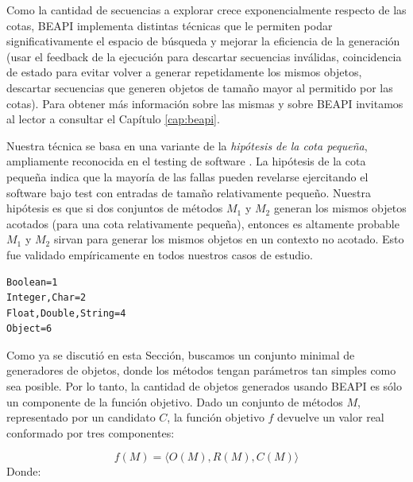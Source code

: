 Como la cantidad de secuencias a explorar crece exponencialmente respecto de las cotas, BEAPI implementa distintas técnicas que le permiten podar significativamente el espacio de búsqueda y mejorar la eficiencia de la generación (usar el feedback de la ejecución para descartar secuencias inválidas, coincidencia de estado para evitar volver a generar repetidamente los mismos objetos, descartar secuencias que generen objetos de tamaño mayor al permitido por las cotas). Para obtener más información sobre las mismas y sobre BEAPI invitamos al lector a consultar el Capítulo \ref{cap:beapi}.

Nuestra técnica se basa en una variante de la \emph{hipótesis de la cota pequeña}, ampliamente reconocida en el testing de software \cite{Andoni:2003,jackson2006, Abad13}. La hipótesis de la cota pequeña indica que la mayoría de las fallas pueden revelarse ejercitando el software bajo test con entradas de tamaño relativamente pequeño. Nuestra hipótesis es que si dos conjuntos de métodos $M_1$ y $M_2$ generan los mismos objetos acotados (para una cota relativamente pequeña), entonces es altamente probable $M_1$ y $M_2$ sirvan para generar los mismos objetos en un contexto no acotado. Esto fue validado empíricamente en todos nuestros casos de estudio.


\begin{lstlisting}[label=fig:rankParameters,caption=Ranking con los tipos de parametros, captionpos=b,frame=tb, float=t]
Boolean=1
Integer,Char=2
Float,Double,String=4
Object=6
\end{lstlisting}

Como ya se discutió en esta Sección, buscamos un conjunto minimal de generadores de objetos, donde los métodos tengan parámetros tan simples como sea posible. Por lo tanto, la cantidad de objetos generados usando BEAPI es sólo un componente de la función objetivo. Dado un conjunto de métodos $M$, representado por un candidato $C$, la función objetivo $f$ devuelve un valor real conformado por tres componentes:

\[
f(M) = \langle O(M), R(M), C(M) \rangle
\]
Donde:

